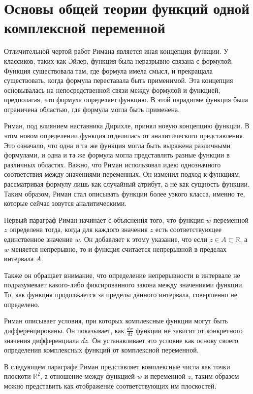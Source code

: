 \documentclass[a4paper,12pt]{article}
\def\R{\mathbb{R}}
\theoremstyle{remark}
\begin{document}
\newpage
\section{Основы общей теории функций одной комплексной переменной}

Отличительной чертой работ Римана является иная концепция функции.
У классиков, таких как Эйлер, функция была неразрывно связана с формулой.
Функция существовала там, где формула имела смысл, и прекращала существовать,
когда формула переставала быть применимой. Эта концепция основывалась на непосредственной
связи между формулой и функцией, предполагая, что формула определяет функцию.
В этой парадигме функция была ограничена областью, где формула могла быть
применена.

Риман, под влиянием наставника Дирихле, принял новую концепцию функции.
В этом новом определении функция отделилась от аналитического представления.
Это означало, что одна и та же функция могла быть выражена различными формулами,
и одна и та же формула могла представлять разные функции в различных областях.
Важно, что Риман использовал идею однозначного соответствия между значениями
переменных. Он изменил подход к функциям, рассматривая формулу лишь как случайный
атрибут, а не как сущность функции. Таким образом, Риман стал описывать функции более
узкого класса, именно те, которые сейчас зовутся аналитическими.

Первый параграф Риман начинает с объяснения того, что функция
$w$ переменной $z$ определена тогда, когда для каждого значения
$z$ есть соответствующее единственное значение
$w$. Он добавляет к этому указание, что если $z\in A\subset\R$, а
$w$ меняется непрерывно, то и функция считается непрерывной в пределах интервала $A$.

Также он обращает внимание, что определение непрерывности в
интервале не подразумевает какого-либо фиксированного закона
между значениями функции. То, как функция продолжается за пределы
данного интервала, совершенно не определено.

Риман описывает условия, при которых комплексные функции могут
быть дифференцированы. Он показывает, как $\frac{dw}{dz}$
функции не зависит от конкретного значения дифференциала $dz$.
Он устанавливает это условие как основу своего определения комплексных
функций от комплексной переменной.

В следующем параграфе Риман представляет комплексные числа как точки плоскоти $\R^2$,
а отношение между функцией $w$ и переменной $z$, таким образом можно представить
как отображение соответствующих им плоскостей.
\end{document}
